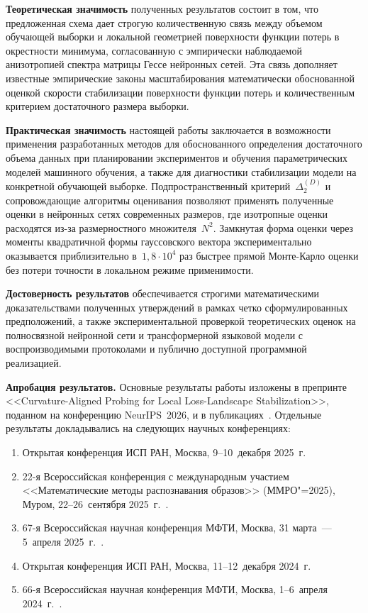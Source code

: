 \textbf{Теоретическая значимость} полученных результатов состоит в том, что предложенная схема дает строгую количественную связь между объемом обучающей выборки и локальной геометрией поверхности функции потерь в окрестности минимума, согласованную с эмпирически наблюдаемой анизотропией спектра матрицы Гессе нейронных сетей. Эта связь дополняет известные эмпирические законы масштабирования математически обоснованной оценкой скорости стабилизации поверхности функции потерь и количественным критерием достаточного размера выборки.

\textbf{Практическая значимость} настоящей работы заключается в возможности применения разработанных методов для обоснованного определения достаточного объема данных при планировании экспериментов и обучения параметрических моделей машинного обучения, а также для диагностики стабилизации модели на конкретной обучающей выборке. Подпространственный критерий~$\Delta_2^{(D)}$ и сопровождающие алгоритмы оценивания позволяют применять полученные оценки в нейронных сетях современных размеров, где изотропные оценки расходятся из-за размерностного множителя~$N^2$. Замкнутая форма оценки через моменты квадратичной формы гауссовского вектора экспериментально оказывается приблизительно в~$1{,}8\cdot 10^4$ раз быстрее прямой Монте-Карло оценки без потери точности в локальном режиме применимости.

\textbf{Достоверность результатов} обеспечивается строгими математическими доказательствами полученных утверждений в рамках четко сформулированных предположений, а также экспериментальной проверкой теоретических оценок на полносвязной нейронной сети и трансформерной языковой модели с воспроизводимыми протоколами и публично доступной программной реализацией.

\textbf{Апробация результатов.} Основные результаты работы изложены в препринте~\cite{kiselev2025curvature} <<Curvature-Aligned Probing for Local Loss-Landscape Stabilization>>, поданном на конференцию NeurIPS~2026, и в публикациях~\cite{kiselev2024unraveling,kiselev2025ssdlb,kiselev2025ssdpdp,meshkov2024convnets}. Отдельные результаты докладывались на следующих научных конференциях:
\begin{enumerate}
    \item Открытая конференция ИСП РАН, Москва, 9--10~декабря 2025~г.
    \item 22-я Всероссийская конференция с международным участием <<Математические методы распознавания образов>> (ММРО"=2025), Муром, 22--26~сентября 2025~г.~\cite{kiselev2025mmro}.
    \item 67-я Всероссийская научная конференция МФТИ, Москва, 31 марта~--- 5~апреля 2025~г.~\cite{kiselev2025conf67mipt,meshkov2025conf67mipt}.
    \item Открытая конференция ИСП РАН, Москва, 11--12~декабря 2024~г.
    \item 66-я Всероссийская научная конференция МФТИ, Москва, 1--6~апреля 2024~г.~\cite{kiselev2024conf66mipt}.
\end{enumerate}


